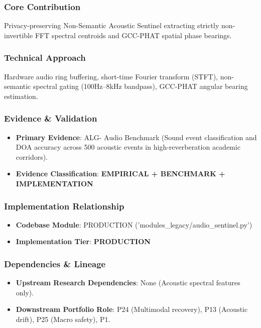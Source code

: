 \documentclass[11pt,letterpaper]{article}
\begin{document}
\subsubsection{Core Contribution}
Privacy-\allowbreak preserving Non-\allowbreak Semantic Acoustic Sentinel extracting strictly non-\allowbreak invertible FFT spectral centroids and GCC-\allowbreak PHAT spatial phase bearings.

\subsubsection{Technical Approach}
Hardware audio ring buffering, short-\allowbreak time Fourier transform (STFT), non-\allowbreak semantic spectral gating (100Hz–8kHz bandpass), GCC-\allowbreak PHAT angular bearing estimation.

\subsubsection{Evidence \& Validation}
\begin{itemize}[leftmargin=*]
    \item \textbf{Primary Evidence}: ALG- Audio Benchmark (Sound event classification and DOA accuracy across 500 acoustic events in high-\allowbreak reverberation academic corridors).
    \item \textbf{Evidence Classification}: \textbf{EMPIRICAL + BENCHMARK + IMPLEMENTATION}
\end{itemize}

\subsubsection{Implementation Relationship}
\begin{itemize}[leftmargin=*]
    \item \raggedright \textbf{Codebase Module}: PRODUCTION ('modules\_\allowbreak legacy/\allowbreak audio\_\allowbreak sentinel.py')
    \item \textbf{Implementation Tier}: \textbf{PRODUCTION}
\end{itemize}

\subsubsection{Dependencies \& Lineage}
\begin{itemize}[leftmargin=*]
    \item \textbf{Upstream Research Dependencies}: None (Acoustic spectral features only).
    \item \textbf{Downstream Portfolio Role}: P24 (Multimodal recovery), P13 (Acoustic drift), P25 (Macro safety), P1.
\end{itemize}
\end{document}
